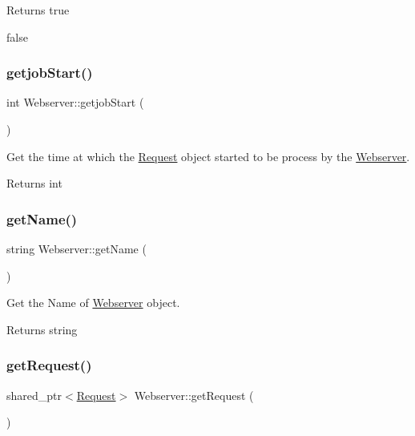 \begin{DoxyReturn}{Returns}
true 

false 
\end{DoxyReturn}
\mbox{\label{classWebserver_ad1ee2d5ae63d1d2674156eb29c3f92ee}} 
\subsubsection{\texorpdfstring{getjob\+Start()}{getjobStart()}}
{\footnotesize\ttfamily int Webserver\+::getjob\+Start (\begin{DoxyParamCaption}{ }\end{DoxyParamCaption})\hspace{0.3cm}{\ttfamily [inline]}}



Get the time at which the \hyperlink{classRequest}{Request} object started to be process by the \hyperlink{classWebserver}{Webserver}. 

\begin{DoxyReturn}{Returns}
int 
\end{DoxyReturn}
\mbox{\label{classWebserver_a7947099345655d9deceb05b37e06978c}} 
\subsubsection{\texorpdfstring{get\+Name()}{getName()}}
{\footnotesize\ttfamily string Webserver\+::get\+Name (\begin{DoxyParamCaption}{ }\end{DoxyParamCaption})\hspace{0.3cm}{\ttfamily [inline]}}



Get the Name of \hyperlink{classWebserver}{Webserver} object. 

\begin{DoxyReturn}{Returns}
string 
\end{DoxyReturn}
\mbox{\label{classWebserver_ad885e697f7623ae3b775664406f57cd0}} 
\subsubsection{\texorpdfstring{get\+Request()}{getRequest()}}
{\footnotesize\ttfamily shared\+\_\+ptr$<$\hyperlink{classRequest}{Request}$>$ Webserver\+::get\+Request (\begin{DoxyParamCaption}{ }\end{DoxyParamCaption})\hspace{0.3cm}{\ttfamily [inline]}}



